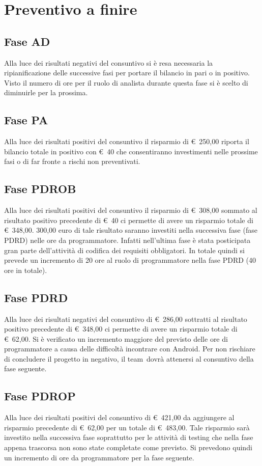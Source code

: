\documentclass[../PianoProgetto.tex]{subfiles}
\begin{document}
\section{Preventivo a finire}

	\subsection{Fase AD}
		Alla luce dei risultati negativi del consuntivo si è resa necessaria la ripianificazione delle successive fasi per portare il bilancio in pari o in positivo. Visto il numero di ore per il ruolo di analista durante questa fase si è scelto di diminuirle per la prossima.
	
	\subsection{Fase PA}
		Alla luce dei risultati positivi del consuntivo il risparmio di \euro\ 250,00 riporta il bilancio totale in positivo con \euro\ 40 che consentiranno investimenti nelle prossime fasi o di far fronte a rischi non preventivati.
	
	\subsection{Fase PDROB}
		Alla luce dei risultati positivi del consuntivo il risparmio di \euro\ 308,00 sommato al risultato positivo precedente di \euro\ 40 ci permette di avere un risparmio totale di \euro\ 348,00. 300,00 euro di tale risultato saranno investiti nella successiva fase (fase PDRD) nelle ore da programmatore. Infatti nell'ultima fase è stata posticipata gran parte dell'attività di codifica dei requisiti obbligatori. In totale quindi si prevede un incremento di 20 ore al ruolo di programmatore nella fase PDRD (40 ore in totale).
	
	\subsection{Fase PDRD}
		Alla luce dei risultati negativi del consuntivo di \euro\ 286,00 sottratti al risultato positivo precedente di \euro\ 348,00 ci permette di avere un risparmio totale di \euro\ 62,00. Si è verificato un incremento maggiore del previsto delle ore di programmatore a causa delle difficoltà incontrare con Android\g. Per non rischiare di concludere il progetto in negativo, il team\g\ dovrà attenersi al consuntivo della fase seguente.
	
	\subsection{Fase PDROP}
		Alla luce dei risultati positivi del consuntivo di \euro\ 421,00 da aggiungere al risparmio precedente di \euro\ 62,00 per un totale di \euro\ 483,00. Tale risparmio sarà investito nella successiva fase soprattutto per le attività di testing che nella fase appena trascorsa non sono state completate come previsto. Si prevedono quindi un incremento di ore da programmatore per la fase seguente.
		
\end{document}
